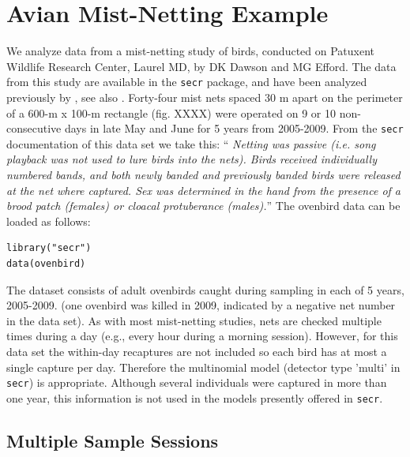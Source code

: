 \section{Avian Mist-Netting Example}

We analyze data from a mist-netting study of birds, conducted on
Patuxent Wildlife Research Center, Laurel MD, by DK Dawson and MG
Efford. The data from this study are available in the \mbox{\tt secr}
package, and have been analyzed previously by
\citet{efford_etal:2004}, see also \citet{borchers_efford:2008}.
Forty-four mist nets spaced 30 m apart on the perimeter of a 600-m x
100-m rectangle (fig. XXXX) were operated on 9 or 10 non-consecutive
days in late May and June for 5 years from 2005-2009.  From the
\mbox{\tt secr} documentation of this data set we take this: ``{\it
  Netting was passive (i.e. song playback was not used to lure birds
  into the nets). Birds received individually numbered bands, and both
  newly banded and previously banded birds were released at the net
  where captured. Sex was determined in the hand from the presence of
  a brood patch (females) or cloacal protuberance (males).}''  
The ovenbird 
data can be loaded as follows:
\begin{verbatim}
library("secr")
data(ovenbird)
\end{verbatim}
The dataset consists of adult ovenbirds caught during sampling in each
of 5 years, 2005-2009. (one ovenbird was killed in 2009, indicated by
a negative net number in the data set).  
As with most mist-netting studies, nets are checked multiple times
during a day (e.g., every hour during a morning session). However, for
this data set the within-day recaptures are not included so each bird
has at most a single capture per day. Therefore the multinomial model
(detector type 'multi' in \mbox{\tt secr}) is appropriate. 
 Although
several individuals were captured in more than one year, this
information is not used in the models presently offered in \mbox{\tt secr}.


\subsection{Multiple Sample Sessions}

